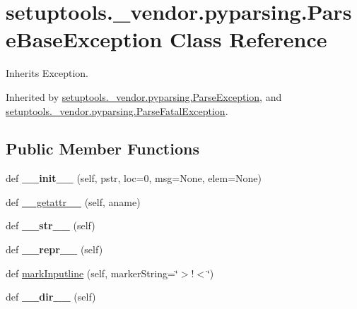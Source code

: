 \hypertarget{classsetuptools_1_1__vendor_1_1pyparsing_1_1_parse_base_exception}{}\section{setuptools.\+\_\+vendor.\+pyparsing.\+Parse\+Base\+Exception Class Reference}
\label{classsetuptools_1_1__vendor_1_1pyparsing_1_1_parse_base_exception}


Inherits Exception.



Inherited by \hyperlink{classsetuptools_1_1__vendor_1_1pyparsing_1_1_parse_exception}{setuptools.\+\_\+vendor.\+pyparsing.\+Parse\+Exception}, and \hyperlink{classsetuptools_1_1__vendor_1_1pyparsing_1_1_parse_fatal_exception}{setuptools.\+\_\+vendor.\+pyparsing.\+Parse\+Fatal\+Exception}.

\subsection*{Public Member Functions}
\begin{DoxyCompactItemize}
\item 
\mbox{\label{classsetuptools_1_1__vendor_1_1pyparsing_1_1_parse_base_exception_a614bf0a27823d558d92bff7d35c7a701}} 
def {\bfseries \+\_\+\+\_\+init\+\_\+\+\_\+} (self, pstr, loc=0, msg=None, elem=None)
\item 
def \hyperlink{classsetuptools_1_1__vendor_1_1pyparsing_1_1_parse_base_exception_a220c42a402e04b0c777fc9e0261ba54a}{\+\_\+\+\_\+getattr\+\_\+\+\_\+} (self, aname)
\item 
\mbox{\label{classsetuptools_1_1__vendor_1_1pyparsing_1_1_parse_base_exception_a7bb94b6435efafa1d7bab08090e5325d}} 
def {\bfseries \+\_\+\+\_\+str\+\_\+\+\_\+} (self)
\item 
\mbox{\label{classsetuptools_1_1__vendor_1_1pyparsing_1_1_parse_base_exception_a67858ef73004c4d3ed2bd3b2139dd755}} 
def {\bfseries \+\_\+\+\_\+repr\+\_\+\+\_\+} (self)
\item 
def \hyperlink{classsetuptools_1_1__vendor_1_1pyparsing_1_1_parse_base_exception_a81fc1da0dca348299a5f0b628550d8f0}{mark\+Inputline} (self, marker\+String=\char`\"{}$>$!$<$\char`\"{})
\item 
\mbox{\label{classsetuptools_1_1__vendor_1_1pyparsing_1_1_parse_base_exception_a56b9a4a39c7b44e8ffbb0e5651e637b6}} 
def {\bfseries \+\_\+\+\_\+dir\+\_\+\+\_\+} (self)
\end{DoxyCompactItemize}
